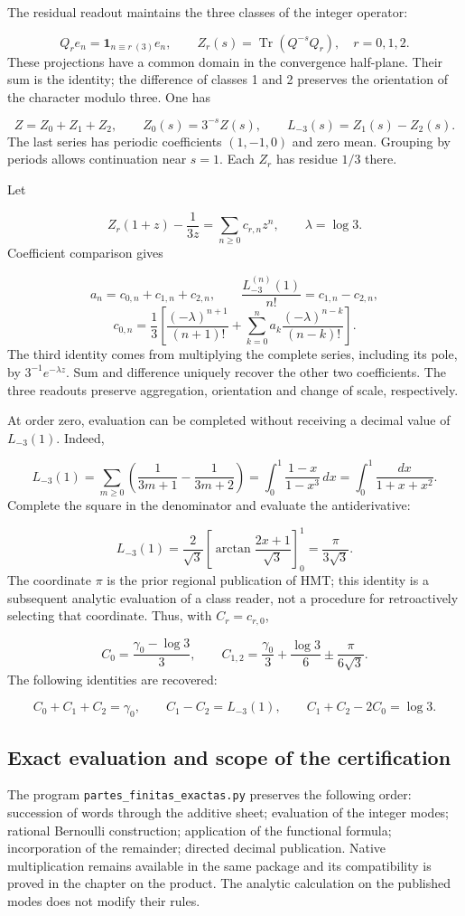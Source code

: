 The residual readout maintains the three classes of the integer operator:

\[
Q_re_n=\mathbf1_{n\equiv r\ (3)}e_n,\qquad
Z_r(s)=\operatorname{Tr}(Q^{-s}Q_r),\quad r=0,1,2.
\]
These projections have a common domain in the convergence half-plane. Their sum is the identity; the difference of classes 1 and 2 preserves the orientation of the character modulo three. One has

\[
Z=Z_0+Z_1+Z_2,\qquad Z_0(s)=3^{-s}Z(s),\qquad
L_{-3}(s)=Z_1(s)-Z_2(s).
\]
The last series has periodic coefficients \((1,-1,0)\) and zero mean. Grouping by periods allows continuation near \(s=1\). Each \(Z_r\) has residue \(1/3\) there.

Let

\[
Z_r(1+z)-\frac1{3z}=\sum_{n\geq0}c_{r,n}z^n,
\qquad \lambda=\log3.
\]
Coefficient comparison gives

\[
a_n=c_{0,n}+c_{1,n}+c_{2,n},\qquad
\frac{L_{-3}^{(n)}(1)}{n!}=c_{1,n}-c_{2,n},
\]
\[
c_{0,n}=\frac13\left[
\frac{(-\lambda)^{n+1}}{(n+1)!}
+\sum_{k=0}^na_k\frac{(-\lambda)^{n-k}}{(n-k)!}\right].
\]
The third identity comes from multiplying the complete series, including its pole, by \(3^{-1}e^{-\lambda z}\). Sum and difference uniquely recover the other two coefficients. The three readouts preserve aggregation, orientation and change of scale, respectively.

At order zero, evaluation can be completed without receiving a decimal value of \(L_{-3}(1)\). Indeed,

\[
L_{-3}(1)=\sum_{m\geq0}\left(\frac1{3m+1}-\frac1{3m+2}\right)
=\int_0^1\frac{1-x}{1-x^3}\,dx
=\int_0^1\frac{dx}{1+x+x^2}.
\]
Complete the square in the denominator and evaluate the antiderivative:

\[
L_{-3}(1)=\frac2{\sqrt3}
\left[\arctan\frac{2x+1}{\sqrt3}\right]_0^1
=\frac{\pi}{3\sqrt3}.
\]
The coordinate \(\pi\) is the prior regional publication of HMT; this identity is a subsequent analytic evaluation of a class reader, not a procedure for retroactively selecting that coordinate. Thus, with \(C_r=c_{r,0}\),

\[
C_0=\frac{\gamma_0-\log3}{3},\qquad
C_{1,2}=\frac{\gamma_0}{3}+\frac{\log3}{6}
\mathbin{\pm}\frac{\pi}{6\sqrt3}.
\]
The following identities are recovered:

\[
C_0+C_1+C_2=\gamma_0,\qquad
C_1-C_2=L_{-3}(1),\qquad C_1+C_2-2C_0=\log3.
\]
\clearpage
\subsection{Exact evaluation and scope of the certification}
The program \texttt{partes\_\allowbreak{}finitas\_\allowbreak{}exactas.\allowbreak{}py} preserves the following order: succession of words through the additive sheet; evaluation of the integer modes; rational Bernoulli construction; application of the functional formula; incorporation of the remainder; directed decimal publication. Native multiplication remains available in the same package and its compatibility is proved in the chapter on the product. The analytic calculation on the published modes does not modify their rules.

